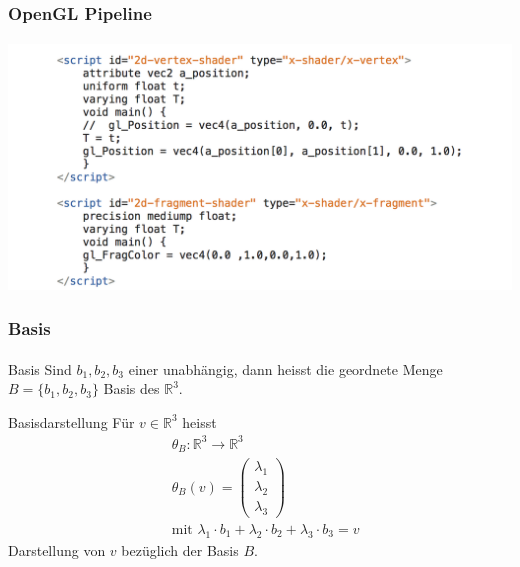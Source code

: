 \documentclass{beamer}
\begin{document}
\begin{frame}
    \frametitle{OpenGL Pipeline}
\framesubtitle{}
    \begin{block}{}
\begin{center}
\includegraphics[scale=0.56]{images/shader}
\end{center}
\end{block}
\end{frame}

\begin{frame}
    \frametitle{Basis}
\framesubtitle{}
    \begin{block}{Basis}
Sind $b_1, b_2, b_3$ einer unabhängig, dann heisst die geordnete Menge
$ B = \{ b_1 , b_2, b_3\}$ Basis des $\mathbb{R}^3$.
\end{block}
 \begin{block}{Basisdarstellung}
Für $v \in \mathbb{R}^3$ heisst
\begin{eqnarray*}
& \theta_B : \mathbb{R}^3 \to  \mathbb{R}^3 \\
& \theta_B(v) =  \begin{pmatrix}
 \lambda_1 \\ \lambda_2 \\ \lambda_3
\end{pmatrix}  \\
& \text{mit } \lambda_1 \cdot b_1 + \lambda_2 \cdot b_2  + \lambda_3 \cdot b_3 = v 
\end{eqnarray*}
Darstellung von $v$ bezüglich der Basis $B$.
\end{block}

\end{frame}
\end{document}
